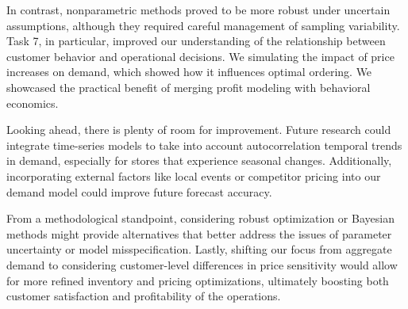 In contrast, nonparametric methods proved to be more robust under uncertain assumptions, although they required careful management of sampling variability. Task 7, in particular, improved our understanding of the relationship between customer behavior and operational decisions. We simulating the impact of price increases on demand, which showed how it influences optimal ordering. We showcased the practical benefit of merging profit modeling with behavioral economics.

Looking ahead, there is plenty of room for improvement. Future research could integrate time-series models to take into account autocorrelation temporal trends in demand, especially for stores that experience seasonal changes. Additionally, incorporating external factors like local events or competitor pricing into our demand model could improve future forecast accuracy.

From a methodological standpoint, considering robust optimization or Bayesian methods might provide alternatives that better address the issues of parameter uncertainty or model misspecification. Lastly, shifting our focus from aggregate demand to considering customer-level differences in price sensitivity would allow for more refined inventory and pricing optimizations, ultimately boosting both customer satisfaction and profitability of the operations.

